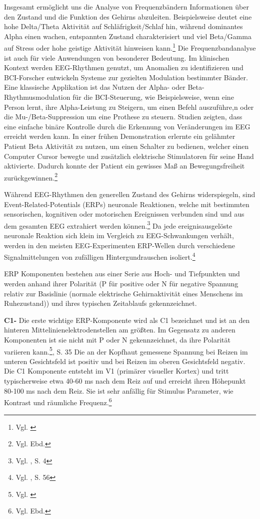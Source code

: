 Insgesamt ermöglicht uns die Analyse von Frequenzbändern Informationen über den Zustand und die Funktion des Gehirns abzuleiten. Beispielsweise deutet eine hohe Delta/Theta Aktivität auf Schläfrigkeit/Schlaf hin, während dominantes Alpha einen wachen, entspannten Zustand charakterisiert und viel Beta/Gamma auf Stress oder hohe geistige Aktivität hinweisen kann.\footnote{Vgl. \cite{wiki_eeg_english}} Die Frequenzbandanalyse ist auch für viele Anwendungen von besonderer Bedeutung. Im klinischen Kontext werden EEG-Rhythmen genutzt, um Anomalien zu identifizieren und BCI-Forscher entwickeln Systeme zur gezielten Modulation bestimmter Bänder. Eine klassische Applikation ist das Nutzen der Alpha- oder Beta-Rhythmusmodulation für die BCI-Steuerung, wie Beispielsweise, wenn eine Person lernt, ihre Alpha-Leistung zu Steigern, um einen Befehl auszuführe,n oder die Mu-/Beta-Suppression um eine Prothese zu steuern. Studien zeigten, dass eine einfache binäre Kontrolle durch die Erkennung von Veränderungen im EEG erreicht werden kann. In einer frühen Demonstration erlernte ein gelähmter Patient Beta Aktivität zu nutzen, um einen Schalter zu bedienen, welcher einen Computer Cursor bewegte und zusätzlich elektrische Stimulatoren für seine Hand aktivierte. Dadurch konnte der Patient ein gewisses Maß an Bewegungsfreiheit zurückgewinnen.\footnote{Vgl. Ebd.}

Während EEG-Rhythmen den generellen Zustand des Gehirns widerspiegeln, sind Event-Related-Potentials (ERPs) neuronale Reaktionen, welche mit bestimmten sensorischen, kognitiven oder motorischen Ereignissen verbunden sind und aus dem gesamten EEG extrahiert werden können.\footnote{Vgl. \cite{luck2005}, S. 4} Da jede ereignisausgelöste neuronale Reaktion sich  klein im Vergleich zu EEG-Schwankungen verhält, werden in den meisten EEG-Experimenten ERP-Wellen durch verschiedene Signalmittelungen von zufälligen Hintergundrauschen isoliert.\footnote{Vgl. \cite{luck2005}, S. 56}

ERP Komponenten bestehen aus einer Serie aus Hoch- und Tiefpunkten und werden anhand ihrer Polarität (P für positive oder N für negative Spannung relativ zur Basislinie (normale elektrische Gehirnaktivität eines Menschens im Ruhezustand)) und ihres typischen Zeitablaufs gekennzeichnet. 

\textbf{C1-}  Die erste wichtige ERP-Komponente wird als C1 bezeichnet und ist  an den hinteren Mittelinienelektrodenstellen am größten. Im Gegensatz zu anderen Komponenten ist sie nicht mit P oder N gekennzeichnet, da ihre Polarität variieren kann.\footnote{Vgl. \cite{luck2005}}, S. 35 Die an der Kopfhaut gemessene Spannung bei Reizen im unteren Gesichtsfeld ist positiv und bei Reizen  im oberen  Gesichtsfeld negativ. Die C1 Komponente entsteht im V1 (primärer visueller Kortex) und tritt typischerweise etwa 40-60 ms nach dem Reiz auf und erreicht ihren Höhepunkt 80-100 ms nach dem Reiz. Sie ist sehr anfällig für Stimulus Parameter, wie Kontrast und räumliche Frequenz.\footnote{Vgl. Ebd.}

